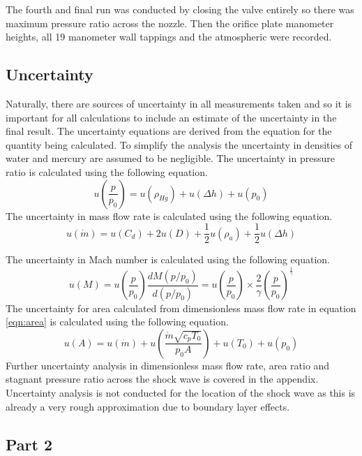 \documentclass{article}
\begin{document}
The fourth and final run was conducted by closing the valve entirely so there was maximum pressure ratio across the nozzle.
Then the orifice plate manometer heights, all 19 manometer wall tappings and the atmospheric were recorded.

\subsection{Uncertainty}

Naturally, there are sources of uncertainty in all measurements taken and so it is important for all calculations to include an estimate of the uncertainty in the final result.
The uncertainty equations are derived from the equation for the quantity being calculated.
To simplify the analysis the uncertainty in densities of water and mercury are assumed to be negligible.
The uncertainty in pressure ratio is calculated using the following equation.
\begin{equation}
    u\left( \frac{p}{p_0} \right) = u(\rho_{Hg}) + u(\Delta h) + u(p_0)
\end{equation}
The uncertainty in mass flow rate is calculated using the following equation.
\begin{equation}
    u(\dot{m}) = u(C_d) + 2u(D) + \frac{1}{2}u(\rho_a) + \frac{1}{2}u(\Delta h)
\end{equation}

The uncertainty in Mach number is calculated using the following equation.
\begin{equation}
    u(M) = u\left( \frac{p}{p_0} \right) \frac{d M ( p/p_0 ) }{d (p/p_0)} = u\left(\frac{p}{p_0}\right) \times \frac{2}{\gamma}  \left( \frac{p}{p_0} \right) ^ {\frac{1}{\gamma}}
\end{equation}
The uncertainty for area calculated from dimensionless mass flow rate in equation \ref{eqn:area} is calculated using the following equation.
\begin{equation}
    u(A) = u(\dot{m}) + u\left(\frac{\dot{m}\sqrt{c_pT_0}}{p_0A}\right) + u(T_0) + u(p_0)
\end{equation}
Further uncertainty analysis in dimensionless mass flow rate, area ratio and stagnant pressure ratio across the shock wave is covered in the appendix.
Uncertainty analysis is not conducted for the location of the shock wave as this is already a very rough approximation due to boundary layer effects.

\subsection{Part 2}
\end{document}
